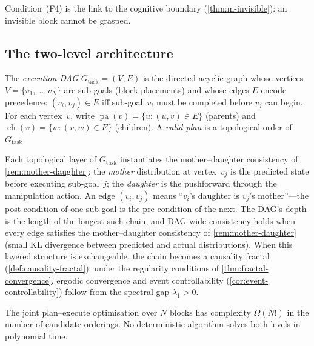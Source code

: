 Condition~(F4) is the link to the cognitive boundary
(\cref{thm:m-invisible}): an invisible block cannot be grasped.

\subsection{The two-level architecture}

\begin{definition}\label{def:m-dag}
The \emph{execution DAG} $G_{\mathrm{task}} = (V, E)$ is the
directed acyclic graph whose vertices $V = \{v_1, \ldots, v_N\}$
are sub-goals (block placements) and whose edges $E$ encode
precedence: $(v_i, v_j) \in E$ iff sub-goal~$v_i$ must be
completed before $v_j$ can begin.
For each vertex~$v$, write $\operatorname{pa}(v) = \{u : (u,v) \in E\}$
(parents) and $\operatorname{ch}(v) = \{w : (v,w) \in E\}$ (children).
A \emph{valid plan} is a topological order
of~$G_{\mathrm{task}}$.
\end{definition}

\begin{remark}
\label{rem:m-dag-md}
Each topological layer of $G_{\mathrm{task}}$ instantiates the
mother--daughter consistency of \cref{rem:mother-daughter}:
the \emph{mother} distribution at vertex~$v_j$ is the
predicted state before executing sub-goal~$j$; the
\emph{daughter} is the pushforward through the manipulation
action.  An edge $(v_i, v_j)$ means ``$v_i$'s daughter is
$v_j$'s mother''---the post-condition of one sub-goal is the
pre-condition of the next.  The DAG's depth is the length of
the longest such chain, and DAG-wide consistency holds when
every edge satisfies the mother--daughter consistency of
\cref{rem:mother-daughter} (small KL divergence between
predicted and actual distributions).  When this layered structure is
exchangeable, the chain becomes a causality fractal
(\cref{def:causality-fractal}): under the regularity
conditions of \cref{thm:fractal-convergence}, ergodic
convergence and event controllability
(\cref{cor:event-controllability}) follow from the spectral
gap $\lambda_1 > 0$.
\end{remark}

\begin{theorem}
\label{thm:m-intractable}
The joint plan--execute optimisation over $N$ blocks has
complexity $\Omega(N!)$ in the number of candidate orderings.
No deterministic algorithm solves both levels in polynomial time.
\end{theorem}


